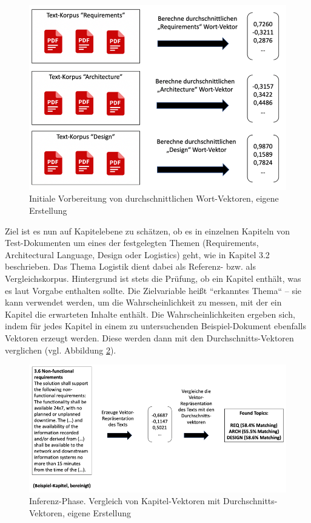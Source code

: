 \begin{figure}[h]
\centering
\includegraphics[scale=0.95]{content/pics/Picture_16.png}
\caption{Initiale Vorbereitung von durchschnittlichen Wort-Vektoren, eigene Erstellung}
\label{Abbildung:avgvec}
\end{figure}

Ziel ist es nun auf Kapitelebene zu schätzen, ob es in einzelnen Kapiteln von Test-Dokumenten um eines der festgelegten Themen (Requirements, Architectural Language, Design oder Logistics) geht, wie in Kapitel 3.2 beschrieben. Das Thema Logistik dient dabei als Referenz- bzw. als Vergleichskorpus. Hintergrund ist stets die Prüfung, ob ein Kapitel enthält, was es laut Vorgabe enthalten sollte. Die Zielvariable heißt ``erkanntes Thema`` – sie kann verwendet werden, um die Wahrscheinlichkeit zu messen, mit der ein Kapitel die erwarteten Inhalte enthält. Die Wahrscheinlichkeiten ergeben sich, indem für jedes Kapitel in einem zu untersuchenden Beispiel-Dokument ebenfalls Vektoren erzeugt werden. Diese werden dann mit den Durchschnitts-Vektoren verglichen (vgl. Abbildung \ref{Abbildung:avgvec2}). 

\begin{figure}[h]
\centering
\includegraphics[scale=0.95]{content/pics/Picture_17.png}
\caption{Inferenz-Phase. Vergleich von Kapitel-Vektoren mit Durchschnitts-Vektoren, eigene Erstellung}
\label{Abbildung:avgvec2}
\end{figure}


